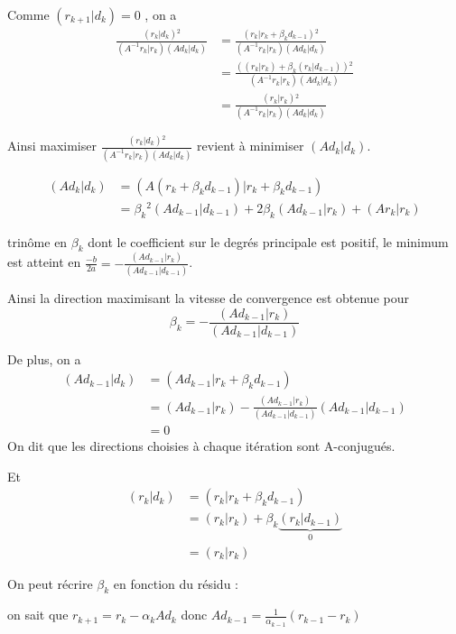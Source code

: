 \documentclass[french]{article}
\begin{document}
Comme $(r_{k+1}|d_{k})=0$ , on a 
\begin{align*}
\frac{(r_{k}|d_{k}){{}^2}}{(A^{-1}r_{k}|r_{k})(Ad_{k}|d_{k})} & =\frac{(r_{k}|r_{k}+\beta_{k}d_{k-1}){{}^2}}{(A^{-1}r_{k}|r_{k})(Ad_{k}|d_{k})}\\
 & =\frac{((r_{k}|r_{k})+\beta_{k}(r_{k}|d_{k-1})){{}^2}}{(A^{-1}r_{k}|r_{k})(Ad_{k}|d_{k})}\\
 & =\frac{(r_{k}|r_{k}){{}^2}}{(A^{-1}r_{k}|r_{k})(Ad_{k}|d_{k})}
\end{align*}

Ainsi maximiser $\frac{(r_{k}|d_{k}){{}^2}}{(A^{-1}r_{k}|r_{k})(Ad_{k}|d_{k})}$
revient à minimiser $(Ad_{k}|d_{k})$.

\begin{align*}
(Ad_{k}|d_{k}) & =(A(r_{k}+\beta_{k}d_{k-1})|r_{k}+\beta_{k}d_{k-1})\\
 & =\beta_{k}{{}^2}(Ad_{k-1}|d_{k-1})+2\beta_{k}(Ad_{k-1}|r_{k})+(Ar_{k}|r_{k})
\end{align*}

trinôme en $\beta_{k}$ dont le coefficient sur le degrés principale
est positif, le minimum est atteint en $\frac{-b}{2a}=-\frac{(Ad_{k-1}|r_{k})}{(Ad_{k-1}|d_{k-1})}$.

Ainsi la direction maximisant la vitesse de convergence est obtenue
pour 
\begin{equation}
\beta_{k}=-\frac{(Ad_{k-1}|r_{k})}{(Ad_{k-1}|d_{k-1})}
\end{equation}

De plus, on a 
\begin{align}
(Ad_{k-1}|d_{k}) & =(Ad_{k-1}|r_{k}+\beta_{k}d_{k-1})\nonumber \\
 & =(Ad_{k-1}|r_{k})-\frac{(Ad_{k-1}|r_{k})}{(Ad_{k-1}|d_{k-1})}(Ad_{k-1}|d_{k-1})\\
 & =0\nonumber 
\end{align}
 On dit que les directions choisies à chaque itération sont A-conjugués. 

Et 
\begin{align}
(r_{k}|d_{k}) & =(r_{k}|r_{k}+\beta_{k}d_{k-1})\nonumber \\
 & =(r_{k}|r_{k})+\beta_{k}\underbrace{(r_{k}|d_{k-1})}_{0}\\
 & =(r_{k}|r_{k})\nonumber 
\end{align}

On peut récrire $\beta_{k}$ en fonction du résidu :

on sait que $r_{k+1}=r_{k}-\alpha_{k}Ad_{k}$ donc $Ad_{k-1}=\frac{1}{\alpha_{k-1}}(r_{k-1}-r_{k})$
\end{document}
